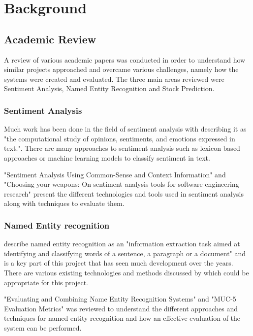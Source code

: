 \chapter{Background}
\label{Background}



\section{Academic Review}
A review of various academic papers was conducted in order to understand how similar projects approached and overcame various challenges, namely how the systems were created and evaluated. The three main areas reviewed were Sentiment Analysis, Named Entity Recognition and Stock Prediction.


    \subsection{Sentiment Analysis}
    \label{background:Sentiment}
    Much work has been done in the field of sentiment analysis with \cite{liu2010sentiment} describing it as "the computational study of opinions, sentiments, and emotions expressed in text.". There are many approaches to sentiment analysis such as lexicon based approaches or machine learning models to classify sentiment in text. \citep{7237157sentiment}
    
    "Sentiment Analysis Using Common-Sense and Context Information" \citep{Agarwal2015} and "Choosing your weapons: On sentiment analysis tools for software engineering research" \citep{7332508} present the different technologies and tools used in sentiment analysis along with techniques to evaluate them. 
    

    \subsection{Named Entity recognition}
    \label{background:NER}
    \cite{NER-book} describe named entity recognition as an "information extraction task aimed at identifying and classifying words of a sentence, a paragraph or a document" and is a key part of this project that has seen much development over the years. There are various existing technologies and methods discussed by \cite{context} which could be appropriate for this project. 
    
    "Evaluating and Combining Name Entity Recognition Systems" \citep{jiang-etal-2016-evaluating} and "{MUC}-5 Evaluation Metrics" \citep{chinchor-sundheim-1993-muc} was reviewed to understand the different approaches and techniques for named entity recognition and how an effective evaluation of the system can be performed.
    
